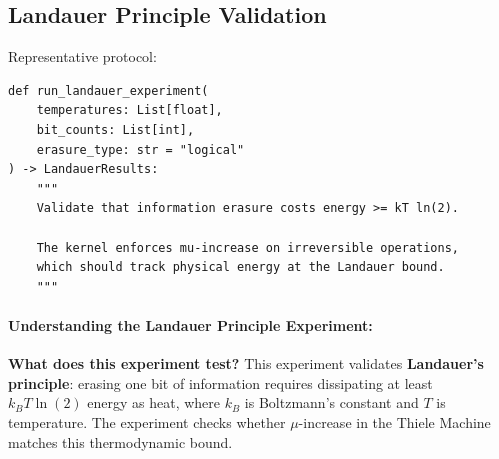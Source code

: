 \subsection{Landauer Principle Validation}

Representative protocol:
\begin{lstlisting}
def run_landauer_experiment(
    temperatures: List[float],
    bit_counts: List[int],
    erasure_type: str = "logical"
) -> LandauerResults:
    """
    Validate that information erasure costs energy >= kT ln(2).
    
    The kernel enforces mu-increase on irreversible operations,
    which should track physical energy at the Landauer bound.
    """
\end{lstlisting}

\paragraph{Understanding the Landauer Principle Experiment:}

\textbf{What does this experiment test?} This experiment validates \textbf{Landauer's principle}: erasing one bit of information requires dissipating at least $k_B T \ln(2)$ energy as heat, where $k_B$ is Boltzmann's constant and $T$ is temperature. The experiment checks whether $\mu$-increase in the Thiele Machine matches this thermodynamic bound.

